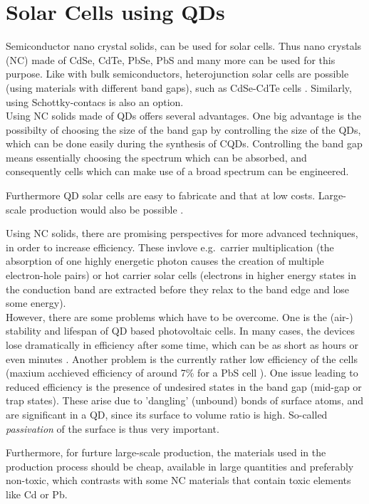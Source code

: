 \section{Solar Cells using QDs}

Semiconductor nano crystal solids, can be used for solar cells. Thus nano crystals (NC) made of CdSe, CdTe, PbSe, PbS and many more can be used for this purpose. Like with bulk semiconductors, heterojunction solar cells are possible (using materials with different band gaps), such as CdSe-CdTe cells \cite[p.430]{ChemRev}. Similarly, using Schottky-contacs is also an option.\\

Using NC solids made of QDs offers several advantages. One big advantage is the possibilty of choosing the size of the band gap by controlling the size of the QDs, which can be done easily during the synthesis of CQDs. Controlling the band gap means essentially choosing the spectrum which can be absorbed, and consequently cells which can make use of a broad spectrum can be engineered.

Furthermore QD solar cells are easy to fabricate and that at low costs. Large-scale production would also be possible \cite[p.447]{ChemRev}.

Using NC solids, there are promising perspectives for more advanced techniques, in order to increase efficiency. These invlove e.g.~carrier multiplication (the absorption of one highly energetic photon causes the creation of multiple electron-hole pairs) or hot carrier solar cells (electrons in higher energy states in the conduction band are extracted before they relax to the band edge and lose some energy).\\

However, there are some problems which have to be overcome. One is the (air-) stability and lifespan of QD based photovoltaic cells. In many cases, the devices lose dramatically in efficiency after some time, which can be as short as hours or even minutes \cite[p.26]{Tang2011}. Another problem is the currently rather low efficiency of the cells (maxium acchieved efficiency of around 7\% for a PbS cell \cite[p.1]{Ip2012}). One issue leading to reduced efficiency is the presence of undesired states in the band gap (mid-gap or trap states). These arise due to 'dangling' (unbound) bonds of surface atoms, and are significant in a QD, since its surface to volume ratio is high. So-called \textit{passivation} of the surface is thus very important. 

Furthermore, for furture large-scale production, the materials used in the production process should be cheap,  available in large quantities and preferably non-toxic, which contrasts with some NC materials that contain toxic elements like Cd or Pb.

